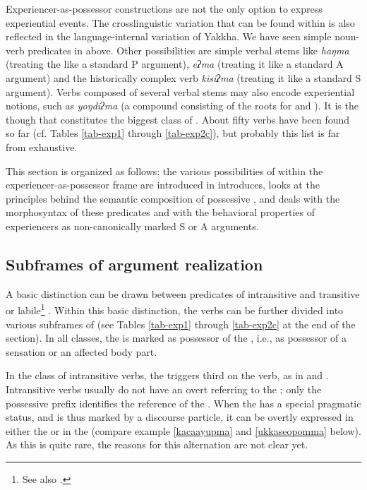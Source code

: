 Experiencer-as-possessor constructions are not the only option to express experiential events. The crosslinguistic variation that can be found within  is also reflected in the language-internal variation of Yakkha. We have seen simple noun-verb predicates in  above. Other possibilities are simple verbal stems like \emph{haŋma}  (treating the  like a standard P argument), \emph{eʔma}  (treating it like a standard A argument) and the  historically complex  verb \emph{kisiʔma}  (treating it like a standard S argument). Verbs composed of several verbal stems may also encode experiential notions, such as \emph{yoŋdiʔma}  (a compound consisting of the roots for  and ). It is the  though that constitutes the biggest class of . About  fifty verbs have been found so far (cf. Tables \ref{tab-exp1} through \ref{tab-exp2c}), but probably this list is far from exhaustive. 

This section is organized as follows:  the various possibilities of  within the experiencer-as-possessor frame are introduced in  introduces,  looks at the principles behind the semantic composition of possessive , and  deals with the morphosyntax of these predicates and with the behavioral properties of experiencers as non-canonically marked S or A arguments. 


\subsection{Subframes of argument realization}\label{poss-e1}

A basic distinction can be drawn between predicates of intransitive  and transitive or labile\footnote{See also .} . Within this  basic distinction, the verbs can be further divided into various subframes of  (see Tables \ref{tab-exp1} through  \ref{tab-exp2c} at the end of the section). In all classes, the  is marked as possessor of the , i.e., as possessor of a sensation or an affected body part.

In the class of intransitive verbs, the  triggers third  on the verb, as in \Last and \Next. Intransitive verbs usually do not have an overt  referring to the ; only the possessive prefix identifies the reference of the . When the  has a special pragmatic status, and is thus marked by a discourse particle, it can be overtly expressed  in either the  or in the  (compare example \ref{kacaayupma} and \ref{ukkaseopomma} below). As this is quite rare, the reasons for this alternation are not clear yet.

